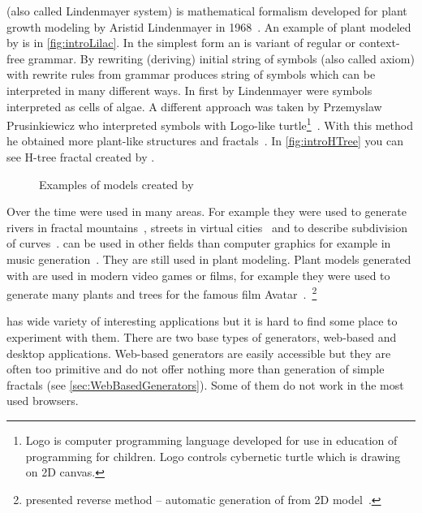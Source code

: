 
\label{sec:Introduction}

\lsystem (also called Lindenmayer system) is mathematical formalism developed for plant growth modeling by Aristid Lindenmayer in 1968~\cite{Lin68}.
An example of plant modeled by \lsystem is in \autoref{fig:introLilac}.
In the simplest form an \lsystem is variant of regular or \mbox{context-free} grammar.
By rewriting (deriving) initial string of symbols (also called axiom) with rewrite rules from grammar \lsystem produces string of symbols which can be interpreted in many different ways.
In first \lsystems by Lindenmayer were symbols interpreted as cells of algae.
A different approach was taken by Przemyslaw Prusinkiewicz who interpreted \lsystem symbols with \mbox{Logo-like} turtle\footnote{
	Logo is computer programming language developed for use in education of programming for children.
	Logo controls cybernetic turtle which is drawing on 2D canvas.}~\cite{Pru85}.
With this method he obtained more plant-like structures and fractals~\cite{CD93}.
In \autoref{fig:introHTree} you can see H-tree fractal created by \lsystem.

\begin{figure}[h!]
	 \hfill
	\caption{Examples of models created by \lsystem}
\end{figure}


Over the time \lsystems were used in many areas.
For example they were used to generate rivers in fractal mountains~\cite{PH93}, streets in virtual cities~\cite{PM01} and to describe subdivision of curves~\cite{PSSK03}.
\lsystems can be used in other fields than computer graphics for example in music generation~\cite{HCJ99, Man06}.
They are still used in plant modeling.
Plant models generated with \lsystems are used in modern video games or films, for example they were used to generate many plants and trees for the famous film Avatar~\cite{Wor08, Dun10}.~\footnote{\citeauthor{SBM10} presented reverse method -- automatic generation of \lsystems from 2D model~\cite{SBM10}.}

\lsystems has wide variety of interesting applications but it is hard to find some place to experiment with them.
There are two base types of \lsystem generators, web-based and desktop applications.
Web-based \lsystem generators are easily accessible but they are often too primitive and do not offer nothing more than generation of simple fractals (see \autoref{sec:WebBasedGenerators}).
Some of them do not work in the most used browsers.

